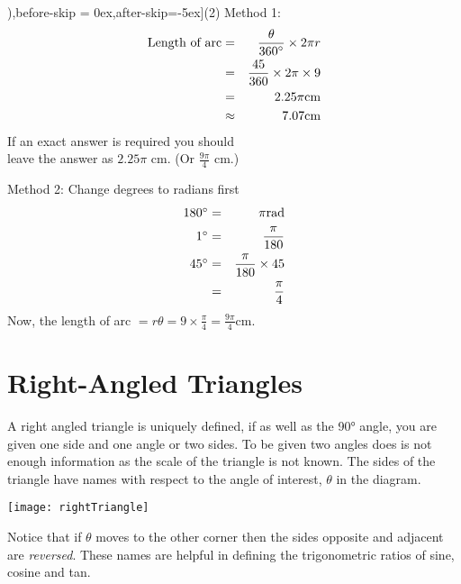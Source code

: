 \solution \begin{tasks}[counter-format=(tsk[1]),before-skip = {0ex},after-skip={-5ex}](2)
	\task Method 1:\begin{eqnarray*}\text{Length of arc} &  = & \frac{\theta }{360 \mbox{{\ensuremath{{}^\circ}}}} \times 2 \pi  r \\
	&  = & \frac{45}{360} \times 2 \pi  \times 9 \\
	&  = & 2.25 \pi \text{}\mbox{cm} \\
	&  \approx  & 7.07\text{}\mbox{cm}\end{eqnarray*}
If an exact answer is required you should\\ leave the answer as $2.25 \pi $ $\mbox{cm}$. (Or $\frac{9 \pi }{4}$ $\mbox{cm}\text{.}$) 

\task Method 2: Change degrees to radians first
\begin{eqnarray*}180 \mbox{{\ensuremath{{}^\circ}}} &  = & \pi \text{}\mbox{rad} \\
	1 \mbox{{\ensuremath{{}^\circ}}} &  = & \frac{\pi }{180} \\
	45 \mbox{{\ensuremath{{}^\circ}}} &  = & \frac{\pi }{180} \times 45 \\
	&  = & \frac{\pi }{4}\end{eqnarray*}
Now, the length of arc $= r \theta = 9 \times \frac{\pi }{4} =\frac{9 \pi }{4}\text{}\mbox{cm}$.
\end{tasks}
\section{Right-Angled Triangles}
A right angled triangle is uniquely defined, if as well as the \ang{90} angle, you are given one side and one angle or two sides. To be given two angles does is not enough information as the scale of the triangle is not known. The sides of the triangle have names with respect to the angle of interest, $\theta$ in the diagram. 
\begin{multicols}{2}
\begin{center}
	\texttt{[image: rightTriangle]}
\end{center}
\columnbreak
Notice that if $\theta$ moves to the other corner then the sides opposite and adjacent are \textit{reversed}. These names are helpful in defining the trigonometric ratios of sine, cosine and tan. \end{multicols}

